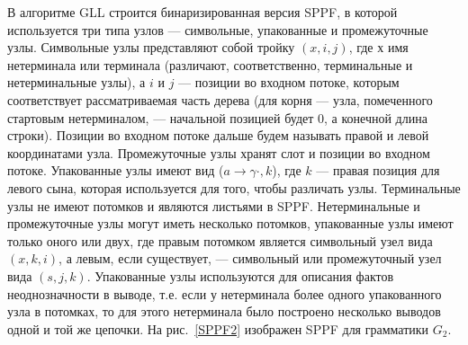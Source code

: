 В алгоритме GLL строится бинаризированная версия SPPF, в которой используется три типа узлов --- символьные, упакованные и промежуточные узлы. Символьные узлы представляют собой тройку $(x, i , j)$, где $х$ имя нетерминала или терминала (различают, соответственно, терминальные и нетерминальные узлы), а $i$ и $j$ --- позиции во входном потоке, которым соответствует рассматриваемая часть дерева (для корня --- узла, помеченного стартовым нетерминалом, --- начальной позицией будет 0, а конечной длина строки). Позиции во входном потоке дальше будем называть правой и левой координатами узла. Промежуточные узлы хранят слот и позиции во входном потоке. Упакованные узлы имеют вид ($ a \rightarrow \gamma \cdot, k$), где $k$ --- правая позиция для левого сына, которая используется для того, чтобы различать узлы. Терминальные узлы не имеют потомков и являются листьями в SPPF. Нетерминальные и промежуточные узлы могут иметь несколько потомков, упакованные узлы имеют только оного или двух, где правым потомком является символьный узел вида $(x, k, i)$, а левым, если существует, --- символьный или промежуточный узел вида $(s, j, k)$. Упакованные узлы используются для описания фактов неоднозначности в выводе, т.е. если у нетерминала более одного упакованного узла в потомках, то для этого нетерминала было построено несколько выводов одной и той же цепочки. На рис.~\ref{SPPF2} изображен SPPF для грамматики $G_2$.

